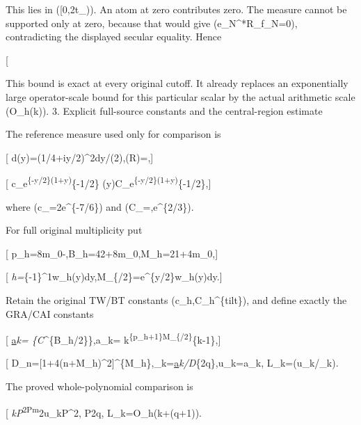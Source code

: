 This lies in ({[}0,2t\_\lambda)). An atom at zero contributes zero. The measure cannot be supported only at zero, because that would give (e\_N\^{}*\mathcal R\_\mu f\_N=0), contradicting the displayed secular equality. Hence

{[}  \tag{EC13}{]}

This bound is exact at every original cutoff. It already replaces an exponentially large operator-scale bound for this particular scalar by the actual arithmetic scale (O\_h(k)). 3. Explicit full-source constants and the central-region estimate

The reference measure used only for comparison is

{[} d\sigma(y)=\textbar{}\Gamma(1/4+iy/2)\textbar\^{}2dy/(2\pi),\quad \sigma(\mathbb R)=\sqrt{2\pi},{]}

{[} c\_\Gamma e\textsuperscript{\{-\pi\textbar y\textbar/2\}(1+\textbar y\textbar)}\{-1/2\} \le\sigma(y)\le C\_\Gamma e\textsuperscript{\{-\pi\textbar y\textbar/2\}(1+\textbar y\textbar)}\{-1/2\},{]}

where (c\_\Gamma=\sqrt2e\^{}\{-7/6\}) and (C\_\Gamma=,e\^{}\{2/3\}).

For full original multiplicity put

{[} p\_h=8m\_0-,\quad B\_h=42+8m\_0,\quad M\_h=21+4m\_0,{]}

{[} \vartheta\emph{h=\int}\{-1\}\^{}1w\_h(y)dy,\quad M\_\{\pi/2\}=\int e\^{}\{\pi y/2\}w\_h(y)dy.{]}

Retain the original TW/BT constants (c\_h,C\_h\^{}\{\rm tilt\}), and define exactly the GRA/CAI constants

{[} \underline a\emph{k=  \{C}\^{}\{B\_h/2\}\},\qquad \overline a\_k= k\textsuperscript{\{p\_h+1\}M\_\{\pi/2\}}\{k-1\},{]}

{[} D\_n={[}1+4(n+M\_h)\^{}2{]}\^{}\{M\_h\},\quad \ell\_k=\underline a\emph{k/D}\{2q\},\quad u\_k=\overline a\_k, \quad \mathscr L\_k=\log(u\_k/\ell\_k). \tag{EC14}{]}

The proved whole-polynomial comparison is

{[} \ell\emph{k\textbar P\textbar{}}\sigma\textsuperscript{2\le\textbar P\textbar m}2\le u\_k\textbar P\textbar{}\sigma\^{}2, \qquad \deg P\le2q, \quad \mathscr L\_k=O\_h(k+\log(q+1)). \tag{EC15}{]}

